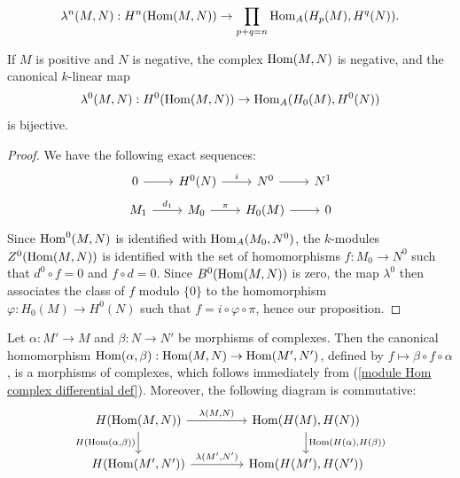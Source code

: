 \[\lambda^n(M,N):H^n(\mathrm{Hom}(M,N))\to\prod_{p+q=n}\mathrm{Hom}_A(H_p(M),H^q(N)).\]
\begin{proposition}\label{module complex positive Hom H_0 bijective}
If $M$ is positive and $N$ is negative, the complex $\mathrm{Hom}(M,N)$ is negative, and the canonical $k$-linear map
\[\lambda^0(M,N):H^0(\mathrm{Hom}(M,N))\to\mathrm{Hom}_A(H_0(M),H^0(N))\]
is bijective.
\end{proposition}
\begin{proof}
We have the following exact sequences:
\begin{equation}
\begin{aligned}
\begin{tikzcd}
0\ar[r]&H^0(N)\ar[r,"i"]&N^0\ar[r]&N^1
\end{tikzcd}\\
\begin{tikzcd}
M_1\ar[r,"d_1"]&M_0\ar[r,"\pi"]&H_0(M)\ar[r]&0
\end{tikzcd}
\end{aligned}
\end{equation}
Since $\mathrm{Hom}^0(M,N)$ is identified with $\mathrm{Hom}_A(M_0,N^0)$, the $k$-modules $Z^0(\mathrm{Hom}(M,N))$ is identified with the set of homomorphisms $f:M_0\to N^0$ such that $d^0\circ f=0$ and $f\circ d=0$. Since $B^0(\mathrm{Hom}(M,N))$ is zero, the map $\lambda^0$ then associates the class of $f$ modulo $\{0\}$ to the homomorphism $\varphi:H_0(M)\to H^0(N)$ such that $f=i\circ\varphi\circ\pi$, hence our proposition.
\end{proof}
Let $\alpha:M'\to M$ and $\beta:N\to N'$ be morphisms of complexes. Then the canonical homomorphism $\mathrm{Hom}(\alpha,\beta):\mathrm{Hom}(M,N)\to\mathrm{Hom}(M',N')$, defined by $f\mapsto\beta\circ f\circ\alpha$, is a morphisms of complexes, which follows immediately from (\ref{module Hom complex differential def}). Moreover, the following diagram is commutative:
\[\begin{tikzcd}[column sep=15mm]
H(\Hom(M,N))\ar[r,"{\lambda(M,N)}"]\ar[d,swap,"{H(\Hom(\alpha,\beta))}"]&\Hom(H(M),H(N))\ar[d,"{\Hom(H(\alpha),H(\beta))}"]\\
H(\Hom(M',N'))\ar[r,"{\lambda(M',N')}"]&\Hom(H(M'),H(N'))
\end{tikzcd}\]
